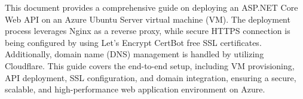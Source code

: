 This document provides a comprehensive guide on deploying an ASP.NET Core Web API on an Azure Ubuntu Server virtual
machine (VM).
The deployment process leverages Nginx as a reverse proxy,
while secure HTTPS connection is being configured by using Let's Encrypt CertBot free SSL certificates.
Additionally, domain name (DNS) management is handled by utilizing Cloudflare.
This guide covers the end-to-end setup, including VM provisioning, API deployment, SSL configuration, and domain integration,
ensuring a secure, scalable, and high-performance web application environment on Azure.
